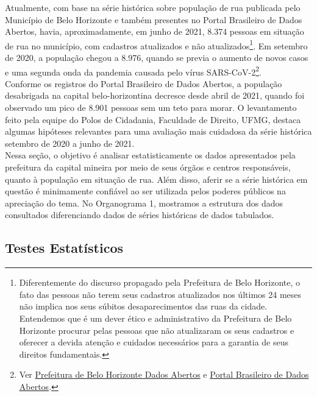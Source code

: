 \documentclass[12pt]{article}
\begin{document}
Atualmente, com base na série histórica sobre população de rua publicada pelo Município de Belo Horizonte e também presentes no Portal Brasileiro de Dados Abertos, havia, aproximadamente, em junho de 2021, 8.374 pessoas em situação de rua no município, com cadastros atualizados e não atualizados\footnote{ Diferentemente do discurso propagado pela Prefeitura de Belo Horizonte, o fato das pessoas não terem seus cadastros atualizados nos últimos 24 meses não implica nos seus súbitos desaparecimentos das ruas da cidade. Entendemos que é um dever ético e administrativo da Prefeitura de Belo Horizonte procurar pelas pessoas que não atualizaram os seus cadastros e oferecer a devida atenção e cuidados necessários para a garantia de seus direitos fundamentais.}. Em setembro de 2020, a população chegou a 8.976, quando se previa o aumento de novos casos e uma segunda onda da pandemia causada pelo vírus SARS-CoV-2\footnote{Ver \href{https://dados.pbh.gov.br/dataset/populacao-de-rua}{Prefeitura de Belo Horizonte Dados Abertos} e \href{https://dados.gov.br/dataset/populacao-de-rua}{Portal Brasileiro de Dados Abertos}.}.\\

Conforme os registros do Portal Brasileiro de Dados Abertos, a população desabrigada na capital belo-horizontina decresce desde abril de 2021, quando foi observado um pico de 8.901 pessoas sem um teto para morar. O levantamento feito pela equipe do Polos de Cidadania, Faculdade de Direito, UFMG, destaca algumas hipóteses relevantes para uma avaliação mais cuidadosa da série histórica setembro de 2020 a junho de 2021.\\

Nessa seção, o objetivo é analisar estatisticamente os dados apresentados pela prefeitura da capital mineira por meio de seus órgãos e centros responsáveis, quanto à população em situação de rua. Além disso, aferir se a série histórica em questão é minimamente confiável ao ser utilizada pelos poderes públicos na apreciação do tema. No Organograma 1, mostramos a estrutura dos dados consultados diferenciando dados de séries históricas de dados tabulados.\\


\subsection{Testes Estatísticos}
\end{document}
